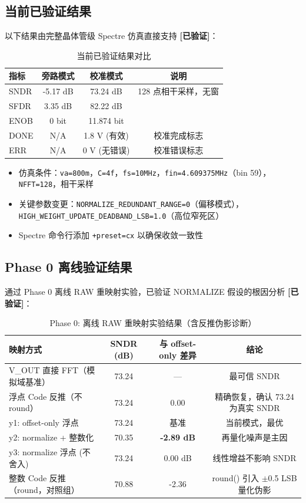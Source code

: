 \documentclass[UTF8,a4paper,11pt]{ctexart}
\newcommand{\verified}{\textcolor{verifiedgreen}{\textbf{[已验证]}}}
\begin{document}
\subsection{当前已验证结果}

以下结果由完整晶体管级 Spectre 仿真直接支持 \verified：

\begin{table}[H]
\centering
\caption{当前已验证结果对比}
\label{tab:verified-results}
\begin{tabular}{lccc}
\toprule
指标 & 旁路模式 & 校准模式 & 说明 \\
\midrule
SNDR  & -5.17 dB   & 73.24 dB    & 128 点相干采样，无窗 \\
SFDR  & 3.35 dB    & 82.22 dB    & \\
ENOB  & 0 bit      & 11.874 bit  & \\
DONE  & N/A        & 1.8 V (有效) & 校准完成标志 \\
ERR   & N/A        & 0 V (无错误) & 校准错误标志 \\
\bottomrule
\end{tabular}
\end{table}

\begin{itemize}[leftmargin=2em]
\item 仿真条件：\texttt{va=800m}，\texttt{C=4f}，\texttt{fs=10MHz}，\texttt{fin=4.609375MHz}（bin 59），\texttt{NFFT=128}，相干采样
\item 关键参数变更：\texttt{NORMALIZE\_REDUNDANT\_RANGE=0}（偏移模式），\texttt{HIGH\_WEIGHT\_UPDATE\_DEADBAND\_LSB=1.0}（高位窄死区）
\item Spectre 命令行添加 \texttt{+preset=cx} 以确保收敛一致性
\end{itemize}

\subsection{Phase 0 离线验证结果}

通过 Phase 0 离线 RAW 重映射实验，已验证 NORMALIZE 假设的根因分析 \verified：

\begin{table}[H]
\centering
\caption{Phase 0: 离线 RAW 重映射实验结果（含反推伪影诊断）}
\label{tab:phase0_results}
\begin{tabular}{lccc}
\toprule
映射方式 & SNDR (dB) & 与 offset-only 差异 & 结论 \\
\midrule
V\_OUT 直接 FFT（模拟域基准） & 73.24 & — & 最可信 SNDR \\
浮点 Code 反推（不 round） & 73.24 & 0.00 & 精确恢复，确认 73.24 为真实 SNDR \\
y1: offset-only 浮点 & 73.24 & 基准 & 当前模式，最优 \\
y2: normalize + 整数化 & 70.35 & \textbf{-2.89 dB} & 再量化噪声是主因 \\
y3: normalize 浮点 (不舍入) & 73.24 & 0.00 dB & 线性增益不影响 SNDR \\
整数 Code 反推（round，对照组） & 70.88 & -2.36 & round() 引入 $\pm$0.5 LSB 量化伪影 \\
\bottomrule
\end{tabular}
\end{table}
\end{document}
